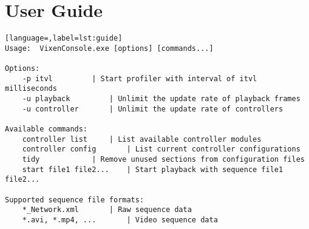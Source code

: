 \chapter{User Guide}
\renewcommand{\baselinestretch}{\mystretch}
\label{chap:Guide}

\begin{lstlisting}[language=,label=lst:guide]
Usage:  VixenConsole.exe [options] [commands...]

Options:
    -p itvl			| Start profiler with interval of itvl milliseconds
    -u playback			| Unlimit the update rate of playback frames
    -u controller		| Unlimit the update rate of controllers

Available commands:
    controller list		| List available controller modules
    controller config		| List current controller configurations
    tidy			| Remove unused sections from configuration files
    start file1 file2...	| Start playback with sequence file1 file2...

Supported sequence file formats:
    *_Network.xml		| Raw sequence data
    *.avi, *.mp4, ...		| Video sequence data
\end{lstlisting}

